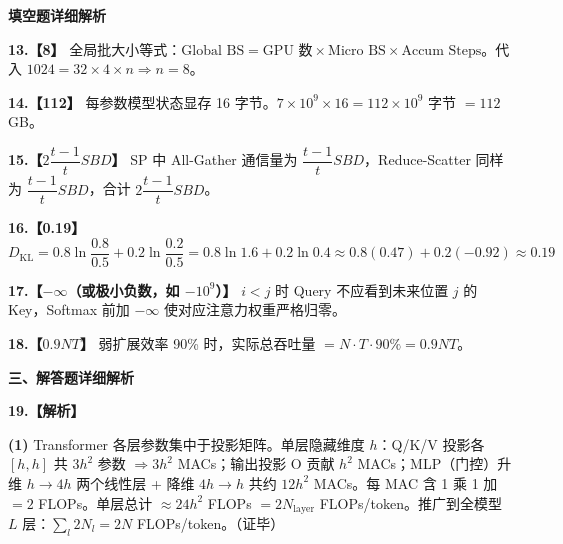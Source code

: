 \documentclass[a4paper]{ctexart}
\newcommand{\bodyfont}{\fontsize{12pt}{16pt}\selectfont}
\begin{document}
\vspace{0.8em}

{\bodyfont\heiti\bfseries 填空题详细解析}

\vspace{0.4em}

\noindent\textbf{13.【8】} 全局批大小等式：$\text{Global BS}=\text{GPU 数}\times\text{Micro BS}\times\text{Accum Steps}$。代入 $1024=32\times4\times n\Rightarrow n=8$。

\vspace{0.5em}

\noindent\textbf{14.【112】} 每参数模型状态显存 16 字节。$7\times10^9\times16=112\times10^9$ 字节 $=112$ GB。

\vspace{0.5em}

\noindent\textbf{15.【$2\dfrac{t-1}{t}SBD$】} SP 中 All-Gather 通信量为 $\dfrac{t-1}{t}SBD$，Reduce-Scatter 同样为 $\dfrac{t-1}{t}SBD$，合计 $2\dfrac{t-1}{t}SBD$。

\vspace{0.5em}

\noindent\textbf{16.【0.19】}
$$D_{\mathrm{KL}}=0.8\ln\frac{0.8}{0.5}+0.2\ln\frac{0.2}{0.5}=0.8\ln 1.6+0.2\ln 0.4\approx0.8(0.47)+0.2(-0.92)\approx0.19$$

\vspace{0.5em}

\noindent\textbf{17.【$-\infty$（或极小负数，如 $-10^9$）】} $i<j$ 时 Query 不应看到未来位置 $j$ 的 Key，Softmax 前加 $-\infty$ 使对应注意力权重严格归零。

\vspace{0.5em}

\noindent\textbf{18.【$0.9NT$】} 弱扩展效率 90\% 时，实际总吞吐量 $=N\cdot T\cdot90\%=0.9NT$。

\newpage

{\bodyfont\heiti\bfseries 三、解答题详细解析}

\vspace{0.5em}

\noindent\textbf{19.【解析】}

\textbf{(1)} Transformer 各层参数集中于投影矩阵。单层隐藏维度 $h$：Q/K/V 投影各 $[h,h]$ 共 $3h^2$ 参数 $\Rightarrow 3h^2$ MACs；输出投影 O 贡献 $h^2$ MACs；MLP（门控）升维 $h\to4h$ 两个线性层 + 降维 $4h\to h$ 共约 $12h^2$ MACs。每 MAC 含 1 乘 1 加 $=2$ FLOPs。单层总计 $\approx24h^2$ FLOPs $=2N_{\mathrm{layer}}$ FLOPs/token。推广到全模型 $L$ 层：$\sum_l 2N_l=2N$ FLOPs/token。\quad（证毕）
\end{document}
